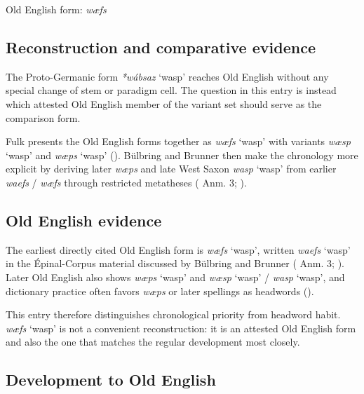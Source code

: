 \documentclass[
  british,
  a4paper,
  openany]{book}
\providecommand{\Recon}[1]{\emph{*#1}}
{\catcode`→=\active \global\def→{\ensuremath{\rightarrow}}}
\providecommand{\Recon}[1]{\emph{*#1}}
{\catcode`→=\active \global\def→{\ensuremath{\rightarrow}}}
\begin{document}
Old English form: \emph{wæfs}

\subsection{Reconstruction and comparative
evidence}\label{reconstruction-and-comparative-evidence-73}

The Proto-Germanic form {\Recon{wábsaz} `wasp'} reaches Old English
without any special change of stem or paradigm cell. The question in
this entry is instead which attested Old English member of the variant
set should serve as the comparison form.

Fulk presents the Old English forms together as {\emph{wæfs}} `wasp'
with variants {\emph{wæsp}} `wasp' and {\emph{wæps}} `wasp'
(). Bülbring and Brunner
then make the chronology more explicit by deriving later \emph{wæps} and
late West Saxon {\emph{wasp}} `wasp' from earlier \emph{waefs} /
\emph{wæfs} through restricted metatheses
( Anm. 3;
).

\subsection{Old English evidence}\label{old-english-evidence-73}

The earliest directly cited Old English form is {\emph{wæfs}} `wasp',
written {\emph{waefs}} `wasp' in the Épinal-Corpus material discussed by
Bülbring and Brunner ( Anm. 3; ). Later Old English also shows {\emph{wæps}} `wasp' and
{\emph{wæsp}} `wasp' / {\emph{wasp}} `wasp', and dictionary practice
often favors {\emph{wæps}} or later spellings as headwords
().

This entry therefore distinguishes chronological priority from headword
habit. {\emph{wæfs}} `wasp' is not a convenient reconstruction: it is an
attested Old English form and also the one that matches the regular
development most closely.

\subsection{Development to Old
English}\label{development-to-old-english-73}
\end{document}
